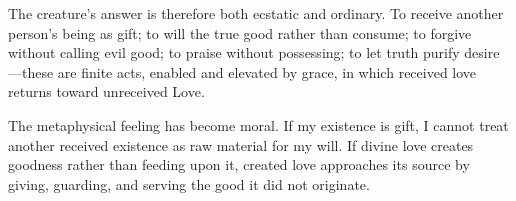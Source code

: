 The creature's answer is therefore both ecstatic and ordinary. To receive another person's being as gift; to will the true good rather than consume; to forgive without calling evil good; to praise without possessing; to let truth purify desire---these are finite acts, enabled and elevated by grace, in which received love returns toward unreceived Love.

The metaphysical feeling has become moral. If my existence is gift, I cannot treat another received existence as raw material for my will. If divine love creates goodness rather than feeding upon it, created love approaches its source by giving, guarding, and serving the good it did not originate.

